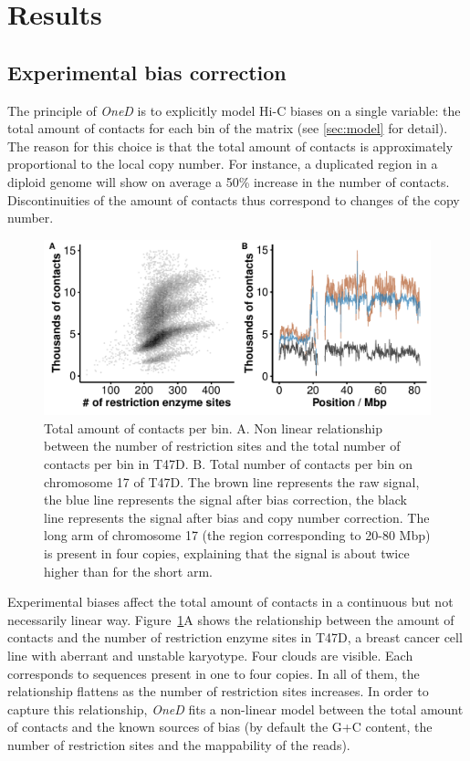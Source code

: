 \documentclass{bioinfo}
\begin{document}

\section{Results}

\subsection{Experimental bias correction}

The principle of \textit{OneD} is to explicitly model Hi-C biases on a
single variable: the total amount of contacts for each bin of the matrix
(see \ref{sec:model} for detail). The reason for this choice is that the
total amount of contacts is approximately proportional to the local copy
number. For instance, a duplicated region in a diploid genome will show on
average a 50\% increase in the number of contacts. Discontinuities of the
amount of contacts thus correspond to changes of the copy number.

\begin{figure}
\centerline{\includegraphics[width=.45\textwidth]{img/figure1.pdf}}
\caption{Total amount of contacts per bin. A. Non linear relationship
between the number of restriction sites and the total number of
contacts per bin in T47D. B. Total number of contacts per bin on
chromosome 17 of T47D. The brown line represents the raw
signal, the blue line represents the signal after bias correction, the
black line represents the signal after bias and copy number correction.
The long arm of chromosome 17 (the region corresponding to 20-80 Mbp) is
present in four copies, explaining that the signal is about twice higher
than for the short arm.}
\label{fig:totals}
\end{figure}


Experimental biases affect the total amount of contacts in a continuous
but not necessarily linear way. Figure~\ref{fig:totals}A shows the
relationship between the amount of contacts and the number of restriction
enzyme sites in T47D, a breast cancer cell line with aberrant and unstable
karyotype.  Four clouds are visible. Each corresponds to sequences present
in one to four copies. In all of them, the relationship flattens as the
number of restriction sites increases. In order to capture this
relationship, \textit{OneD} fits a non-linear model between the total
amount of contacts and the known sources of bias (by default the G+C
content, the number of restriction sites and the mappability of the
reads).
\end{document}
